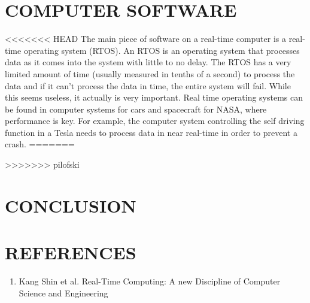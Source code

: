 \documentclass[letterpaper, 10 pt, conference]{IEEEconf}
\begin{document}
\section{COMPUTER SOFTWARE}

<<<<<<< HEAD
The main piece of software on a real-time computer is a real-time operating system (RTOS). An RTOS is an operating system
that processes data as it comes into the system with little to no delay. The RTOS has a very limited amount of time (usually
measured in tenths of a second) to process the data and if it can't process the data in time, the entire system will fail. While this seems useless, it actually
is very important. Real time operating systems can be found in computer systems for cars and spacecraft for NASA, where performance
is key. For example, the computer system controlling the self driving function in a Tesla needs to process data in near real-time
in order to prevent a crash.
=======

>>>>>>> pilofski

\section{CONCLUSION}

\section*{REFERENCES}

\begin{enumerate}
\item Kang Shin et al. Real-Time Computing: A new Discipline of Computer Science and Engineering
\end{enumerate}
\end{document}
